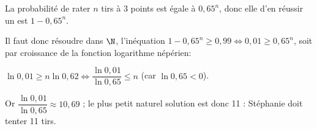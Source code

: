 \begin{enumerate}
La probabilité de rater $n$ tirs à 3 points est égale à $0,65^n$, donc elle d'en réussir un est $1 - 0,65^n$.

Il faut donc résoudre dans $\N$, l'inéquation $1 - 0,65^n \geqslant 0,99 \iff 0,01 \geqslant 0,65^n$, soit par croissance de la fonction logarithme népérien:

$\ln 0,01 \geqslant n\ln 0,62 \iff \dfrac{\ln 0,01}{\ln 0,65} \leqslant n$ (car $\ln 0,65 < 0$).

Or $\dfrac{\ln 0,01}{\ln 0,65} \approx 10,69$ ; le plus petit naturel solution est donc 11 : Stéphanie doit tenter 11 tirs.
\end{enumerate}

\bigskip
